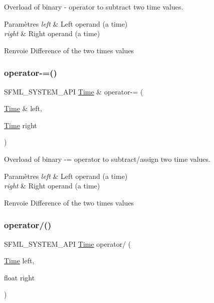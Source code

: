 Overload of binary -\/ operator to subtract two time values. 


\begin{DoxyParams}{Paramètres}
{\em left} & Left operand (a time) \\
\hline
{\em right} & Right operand (a time)\\
\hline
\end{DoxyParams}
\begin{DoxyReturn}{Renvoie}
Difference of the two times values 
\end{DoxyReturn}
\mbox{\label{classsf_1_1Time_aaf7888302cf4847f97cfc26875367b94}} 
\subsubsection{\texorpdfstring{operator-\/=()}{operator-=()}}
{\footnotesize\ttfamily S\+F\+M\+L\+\_\+\+S\+Y\+S\+T\+E\+M\+\_\+\+A\+PI \hyperlink{classsf_1_1Time}{Time} \& operator-\/= (\begin{DoxyParamCaption}\item[{\hyperlink{classsf_1_1Time}{Time} \&}]{left,  }\item[{\hyperlink{classsf_1_1Time}{Time}}]{right }\end{DoxyParamCaption})\hspace{0.3cm}{\ttfamily [related]}}



Overload of binary -\/= operator to subtract/assign two time values. 


\begin{DoxyParams}{Paramètres}
{\em left} & Left operand (a time) \\
\hline
{\em right} & Right operand (a time)\\
\hline
\end{DoxyParams}
\begin{DoxyReturn}{Renvoie}
Difference of the two times values 
\end{DoxyReturn}
\mbox{\label{classsf_1_1Time_a3386c392dbc62e51dfa59730854d1ed2}} 
\subsubsection{\texorpdfstring{operator/()}{operator/()}\hspace{0.1cm}{\footnotesize\ttfamily [1/3]}}
{\footnotesize\ttfamily S\+F\+M\+L\+\_\+\+S\+Y\+S\+T\+E\+M\+\_\+\+A\+PI \hyperlink{classsf_1_1Time}{Time} operator/ (\begin{DoxyParamCaption}\item[{\hyperlink{classsf_1_1Time}{Time}}]{left,  }\item[{float}]{right }\end{DoxyParamCaption})\hspace{0.3cm}{\ttfamily [related]}}




